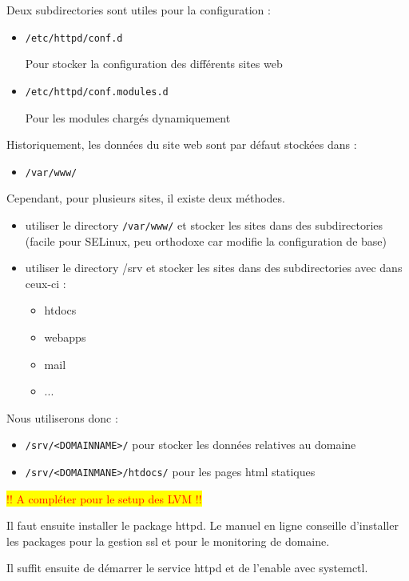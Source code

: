 \documentclass{article}
\begin{document}
	Deux subdirectories sont utiles pour la configuration :
	\begin{itemize}
		\item \texttt{/etc/httpd/conf.d}
		
		Pour stocker la configuration des différents sites web
		\item \texttt{/etc/httpd/conf.modules.d}
		
		Pour les modules chargés dynamiquement
	\end{itemize}
	Historiquement, les données du site web sont par défaut stockées dans :
	\begin{itemize}
		\item \texttt{/var/www/}
	\end{itemize}
	Cependant, pour plusieurs sites, il existe deux méthodes.
	\begin{itemize}
		\item utiliser  le directory \texttt{/var/www/} et stocker les sites dans des subdirectories (facile pour SELinux, peu orthodoxe car modifie la configuration de base)
		\item utiliser le directory /srv et stocker les sites dans des subdirectories avec dans ceux-ci :
		\begin{itemize}
			 \item htdocs
			 \item webapps
			 \item mail
			 \item ...
		\end{itemize}
	\end{itemize}
	Nous utiliserons donc :
	\begin{itemize}
		\item \texttt{/srv/<DOMAINNAME>/} pour stocker les données relatives au domaine
		\item  \texttt{/srv/<DOMAINMANE>/htdocs/} pour les pages html statiques
	\end{itemize}
	\colorbox{yellow}{\textcolor{red}{!! A compléter pour le setup des LVM !!}}
	
	
	Il faut  ensuite installer le package httpd. Le manuel en ligne conseille d'installer les packages pour la gestion ssl et pour le monitoring de domaine.
	
	Il suffit ensuite de démarrer le service httpd et de l'enable avec systemctl.
	
\end{document}
